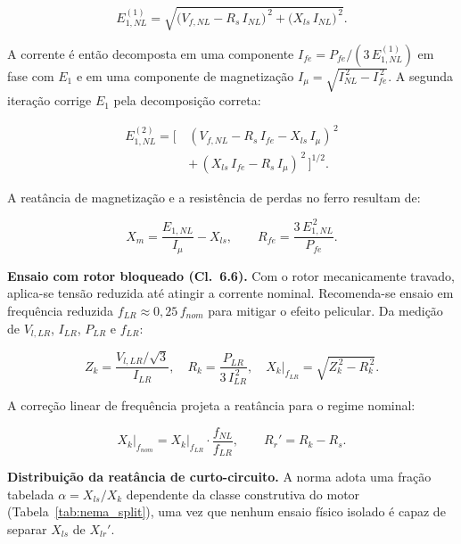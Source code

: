 \begin{equation}
\label{eq:ieee_e1_iter1}
E_{1,NL}^{(1)} = \sqrt{\bigl(V_{f,NL} - R_s\,I_{NL}\bigr)^{\,2} + \bigl(X_{ls}\,I_{NL}\bigr)^{\,2}}.
\end{equation}

\noindent A corrente é então decomposta em uma componente $I_{fe} = P_{fe}/(3\,E_{1,NL}^{(1)})$ em fase com $E_1$ e em uma componente de magnetização $I_\mu = \sqrt{I_{NL}^{\,2} - I_{fe}^{\,2}}$. A segunda iteração corrige $E_1$ pela decomposição correta:

\begin{equation}
\label{eq:ieee_e1_iter2}
\begin{split}
E_{1,NL}^{(2)} = \big[\,&(V_{f,NL} - R_s\,I_{fe} - X_{ls}\,I_\mu)^{\,2} \\
&+\, (X_{ls}\,I_{fe} - R_s\,I_\mu)^{\,2}\,\big]^{1/2}.
\end{split}
\end{equation}

\noindent A reatância de magnetização e a resistência de perdas no ferro resultam de:

\begin{equation}
\label{eq:ieee_xm_rfe}
X_m = \frac{E_{1,NL}}{I_\mu} - X_{ls}, \qquad R_{fe} = \frac{3\,E_{1,NL}^{\,2}}{P_{fe}}.
\end{equation}

\textbf{Ensaio com rotor bloqueado (Cl.~6.6).} Com o rotor mecanicamente travado, aplica-se tensão reduzida até atingir a corrente nominal. Recomenda-se ensaio em frequência reduzida $f_{LR} \approx 0{,}25\,f_{nom}$ para mitigar o efeito pelicular. Da medição de $V_{l,LR}$, $I_{LR}$, $P_{LR}$ e $f_{LR}$:

\begin{equation}
\label{eq:ieee_zk}
Z_k = \frac{V_{l,LR}/\sqrt{3}}{I_{LR}}, \quad R_k = \frac{P_{LR}}{3\,I_{LR}^{\,2}}, \quad X_k\big|_{f_{LR}} = \sqrt{Z_k^{\,2} - R_k^{\,2}}.
\end{equation}

\noindent A correção linear de frequência projeta a reatância para o regime nominal:

\begin{equation}
\label{eq:ieee_xk_corr}
X_k\big|_{f_{nom}} = X_k\big|_{f_{LR}} \cdot \frac{f_{NL}}{f_{LR}}, \qquad R_r' = R_k - R_s.
\end{equation}

\textbf{Distribuição da reatância de curto-circuito.} A norma adota uma fração tabelada $\alpha = X_{ls}/X_k$ dependente da classe construtiva do motor (Tabela~\ref{tab:nema_split}), uma vez que nenhum ensaio físico isolado é capaz de separar $X_{ls}$ de $X_{lr}'$.

